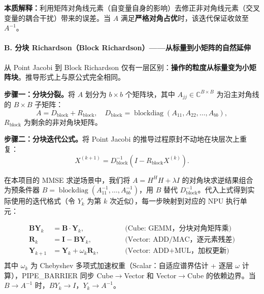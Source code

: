     \textbf{本质解释：}利用矩阵对角线元素（自变量自身的影响）去修正非对角线元素（交叉变量的耦合干扰）带来的误差。当
    $A$ 满足\textbf{严格对角占优}时，该迭代保证收敛至 $A^{-1}$。

    \paragraph{B. 分块 Richardson（Block Richardson）——从标量到小矩阵的自然延伸}

    从 Point Jacobi 到 Block Richardson 仅有一层区别：\textbf{操作的粒度从标量变为小矩阵块}。推导形式上与原公式完全相同。

    \textbf{步骤一：分块分裂。}将 $A$ 划分为 $b \times b$ 个矩阵块，其中
    $A_{jj}\in \mathbb{C}^{B \times B}$ 为沿主对角线的 $B \times B$ 子矩阵：
    \begin{equation}
        A = D_{\text{block}}+ R_{\text{block}},\quad D_{\text{block}}= \operatorname{blockdiag}
        (A_{11}, A_{22}, \dots, A_{bb}),
    \end{equation}
    $R_{\text{block}}$ 为剩余的非对角块矩阵。

    \textbf{步骤二：分块迭代公式。}将 Point Jacobi 的推导过程原封不动地在块层次上重复：
    \begin{equation}
        \boxed{X^{(k+1)} = D_{\text{block}}^{-1}(I - R_{\text{block}} X^{(k)})}.
    \end{equation}

    在本项目的 MMSE 求逆场景中，我们将 $A = H^{H}H + \lambda I$
    的对角块求逆结果组合为预条件器
    $B = \operatorname{blockdiag}(A_{11}^{-1}, \dots, A_{bb}^{-1})$，用 $B$ 替代
    $D_{\text{block}}^{-1}$。代入上式得到实际使用的迭代格式（令 $Y_{k}$ 为第 $k$
    次近似），每一步映射到对应的 NPU 执行单元：

    \begin{equation}
        \boxed{ \begin{aligned}\bm{B}\bm{Y}_{k}&= \bm{B}\cdot \bm{Y}_{k}, \qquad&&\text{(Cube: GEMM，分块对角矩阵乘)}\\ \bm{R}_{k}&= \bm{I}- \bm{B}\bm{Y}_{k}, \qquad&&\text{(Vector: ADD/MAC，逐元素残差)}\\ \bm{Y}_{k+1}&= \bm{Y}_{k}+ \omega_{k}\bm{R}_{k}, \qquad&&\text{(Vector: ADD+MUL，加权更新)}\\\end{aligned}}
        \label{eq:bri-iter}
    \end{equation}
    其中 $\omega_{k}$ 为 Chebyshev 多项式加速权重（Scalar：自适应谱界估计 + 逐层
    $\omega$ 计算），PIPE\_BARRIER 同步 Cube$\rightarrow$Vector 和 Vector$\rightarrow$Cube
    的依赖边界。当 $B \to A^{-1}$ 时，$BY_{k}\to I$，$Y_{k}\to A^{-1}$。

